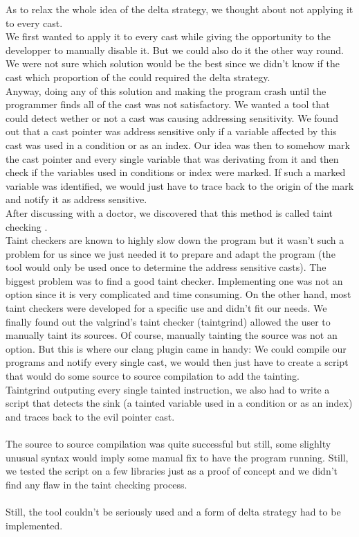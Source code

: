 \documentclass[english]{enstaPRE}
\begin{document}
As to relax the whole idea of the delta strategy, we thought about not applying it to every cast. \\
We first wanted to apply it to every cast while giving the opportunity to the developper to manually disable it. But we could also do
it the other way round. We were not sure which solution would be the best since we didn't know if the cast which proportion of the 
could required the delta strategy. \\ Anyway, doing any of this solution and making the program crash until the programmer finds all
of the cast was not satisfactory.
We wanted a tool that could detect wether or not a cast was causing addressing sensitivity. We found out that a cast pointer was
address sensitive only if a variable affected by this cast was used in a condition or as an index.
Our idea was then to somehow mark the cast pointer and every single variable that was derivating from it and then check if the variables
used in conditions or index were marked. If such a marked variable was identified, we would just have to trace back to the origin of
the mark and notify it as address sensitive. \\ 
After discussing with a doctor, we discovered that this method is called taint checking \cite{taint}. \\
Taint checkers are known to highly slow down the program but it wasn't such a problem for us since we just needed it to prepare and 
adapt the program (the tool would only be used once to determine the address sensitive casts). The biggest problem was to find a good 
taint checker. Implementing one was not an option since it is very complicated and time consuming. On the other hand, most taint 
checkers were developed for a specific use and didn't fit our needs. We finally found out the valgrind's taint checker (taintgrind)
allowed the user to manually taint its sources. Of course, manually tainting the source was not an option. But this is where our
clang plugin came in handy: We could compile our programs and notify every single cast, we would then just have to create a script 
that would do some source to source compilation to add the tainting.
\\ 
Taintgrind outputing every single tainted instruction, we also had to write a script that detects the sink (a tainted variable used
in a condition or as an index) and traces back to the evil pointer cast. \\ \\
The source to source compilation was quite successful but still, some slighlty unusual syntax would imply some manual fix to have the
program running. Still, we tested the script on a few libraries just as a proof of concept and we didn't find any flaw in the taint
checking process. \\ \\
Still, the tool couldn't be seriously used and a form of delta strategy had to be implemented. \\
\end{document}
